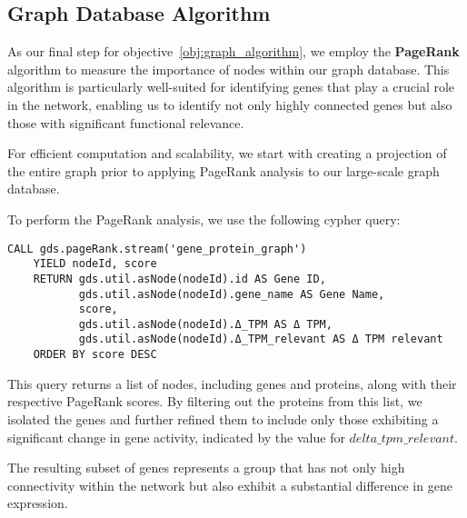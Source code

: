 \subsection{Graph Database Algorithm} \label{subsec:graph_database_algo}
As our final step for objective~\ref{obj:graph_algorithm},
we employ the \textbf{PageRank} algorithm to measure the importance of nodes within our graph database.
This algorithm is particularly well-suited for identifying genes that play a crucial role in the network,
enabling us to identify not only highly connected genes but also those with significant functional relevance.

For efficient computation and scalability,
we start with creating a projection of the entire graph prior to applying PageRank analysis to our large-scale graph database.

To perform the PageRank analysis, we use the following cypher query:
\begin{lstlisting}[language=Cypher, label={lst:pagerank}]
    CALL gds.pageRank.stream('gene_protein_graph')
    YIELD nodeId, score
    RETURN gds.util.asNode(nodeId).id AS Gene ID,
           gds.util.asNode(nodeId).gene_name AS Gene Name,
           score,
           gds.util.asNode(nodeId).Δ_TPM AS Δ TPM,
           gds.util.asNode(nodeId).Δ_TPM_relevant AS Δ TPM relevant
    ORDER BY score DESC
\end{lstlisting}

This query returns a list of nodes, including genes and proteins, along with their respective PageRank scores.
By filtering out the proteins from this list, we isolated the genes and
further refined them to include only those exhibiting a significant change in gene activity,
indicated by the value for $delta\_tpm\_relevant$.

The resulting subset of genes represents a group that has not only high connectivity
within the network but also exhibit a substantial difference in gene expression.